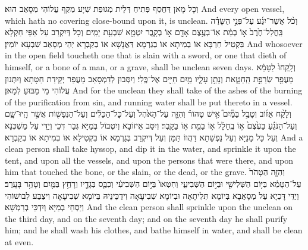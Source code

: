 {וְכָל מָאן דַּחֲסַף פְּתִיחַ דְּלֵית מְגוּפַת שְׁיָע מַקַּף עֲלוֹהִי מְסָאַב הוּא׃}
{And every open vessel, which hath no covering close-bound upon it, is unclean.}{}
{וְכֹ֨ל אֲשֶׁר־יִגַּ֜ע עַל־פְּנֵ֣י הַשָּׂדֶ֗ה בַּֽחֲלַל־חֶ֙רֶב֙ א֣וֹ בְמֵ֔ת אֽוֹ־בְעֶ֥צֶם אָדָ֖ם א֣וֹ בְקָ֑בֶר יִטְמָ֖א שִׁבְעַ֥ת יָמִֽים׃
}
{וְכָל דְּיִקְרַב עַל אַפֵּי חַקְלָא בִּקְטִיל חַרְבָּא אוֹ בְמִיתָא אוֹ בְגַרְמָא דַּאֲנָשָׁא אוֹ בְקַבְרָא יְהֵי מְסָאַב שִׁבְעָא יוֹמִין׃}
{And whosoever in the open field toucheth one that is slain with a sword, or one that dieth of himself, or a bone of a man, or a grave, shall be unclean seven days.}{}
{וְלָֽקְחוּ֙ לַטָּמֵ֔א מֵעֲפַ֖ר שְׂרֵפַ֣ת הַֽחַטָּ֑את וְנָתַ֥ן עָלָ֛יו מַ֥יִם חַיִּ֖ים אֶל־כֶּֽלִי׃}
{וְיִסְּבוּן לְדִמְסָאַב מֵעֲפַר יְקֵידַת חַטָּתָא וְיִתְּנוּן עֲלוֹהִי מֵי מַבּוּעַ לְמָאן׃}
{And for the unclean they shall take of the ashes of the burning of the purification from sin, and running water shall be put thereto in a vessel.}{}
{וְלָקַ֨ח אֵז֜וֹב וְטָבַ֣ל בַּמַּ֘יִם֮ אִ֣ישׁ טָהוֹר֒ וְהִזָּ֤ה עַל־הָאֹ֙הֶל֙ וְעַל־כׇּל־הַכֵּלִ֔ים וְעַל־הַנְּפָשׁ֖וֹת אֲשֶׁ֣ר הָֽיוּ־שָׁ֑ם וְעַל־הַנֹּגֵ֗עַ בַּעֶ֙צֶם֙ א֣וֹ בֶֽחָלָ֔ל א֥וֹ בַמֵּ֖ת א֥וֹ בַקָּֽבֶר׃}
{וְיִסַּב אֵיזוֹבָא וְיִטְבּוֹל בְּמַיָּא גְּבַר דְּכֵי וְיַדֵּי עַל מַשְׁכְּנָא וְעַל כָּל מָנַיָּא וְעַל נַפְשָׁתָא דַּהֲווֹ תַּמָּן וְעַל דְּיִקְרַב בְּגַרְמָא אוֹ בִקְטִילָא אוֹ בְמִיתָא אוֹ בְקַבְרָא׃}
{And a clean person shall take hyssop, and dip it in the water, and sprinkle it upon the tent, and upon all the vessels, and upon the persons that were there, and upon him that touched the bone, or the slain, or the dead, or the grave.}{}
{וְהִזָּ֤ה הַטָּהֹר֙ עַל־הַטָּמֵ֔א בַּיּ֥וֹם הַשְּׁלִישִׁ֖י וּבַיּ֣וֹם הַשְּׁבִיעִ֑י וְחִטְּאוֹ֙ בַּיּ֣וֹם הַשְּׁבִיעִ֔י וְכִבֶּ֧ס בְּגָדָ֛יו וְרָחַ֥ץ בַּמַּ֖יִם וְטָהֵ֥ר בָּעָֽרֶב׃
}
{וְיַדֵּי דָּכְיָא עַל מְסָאֲבָא בְּיוֹמָא תְּלִיתָאָה וּבְיוֹמָא שְׁבִיעָאָה וִידַכֵּינֵיהּ בְּיוֹמָא שְׁבִיעָאָה וִיצַבַּע לְבוּשׁוֹהִי וְיַסְחֵי בְמַיָּא וְיִדְכֵּי בְרַמְשָׁא׃}
{And the clean person shall sprinkle upon the unclean on the third day, and on the seventh day; and on the seventh day he shall purify him; and he shall wash his clothes, and bathe himself in water, and shall be clean at even.}{}
